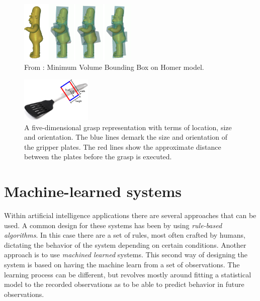 \begin{figure}
	\centering
	\includegraphics[width=0.5\textwidth]{img/related-work/mvbb.png}
	\caption{From \parencite{Huebner2008}: Minimum Volume Bounding Box on Homer model.}
	\label{fig:rel__mvbb}
\end{figure}

\begin{figure}
	\centering
	\includegraphics[width=0.3\textwidth]{img/related-work/grasp-representation.png}
	\caption{A five-dimensional grasp representation with terms of location, size and orientation. The blue lines demark the size and orientation of the gripper plates. The red lines show the approximate distance between the plates before the grasp is executed.}
	\label{fig:grasp-representation}
\end{figure}


\section{Machine-learned systems}
\label{sec:machine_learned_systems}
Within artificial intelligence applications there are several approaches that can be used. A common design for these systems has been by using \emph{rule-based algorithms}. In this case there are a set of rules, most often crafted by humans, dictating the behavior of the system depending on certain conditions. Another approach is to use \emph{machined learned} systems. This second way of designing the system is based on having the machine learn from a set of observations. The learning process can be different, but revolves mostly around fitting a statistical model to the recorded observations as to be able to predict behavior in future observations.

